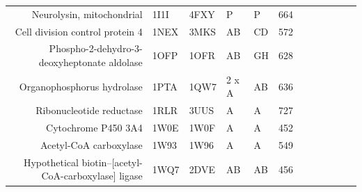 \begin{table}
\begin{changemargin}{15mm}
\begin{scriptsize}
\begin{tabular}{ r p{0.8cm} p{0.8cm} p{0.8cm} p{0.8cm} l l l l l l l }
Neurolysin, mitochondrial                                & 1I1I & 4FXY & P     & P     & 664 & \cellcolor[rgb]{ 1,  .494,  .475}    & \cellcolor[rgb]{ 1,  .494,  .475}    & \cellcolor[rgb]{ 1,  .494,  .475}    & \cellcolor[rgb]{ 1,  .494,  .475}    & \cellcolor[rgb]{ 1,  .494,  .475}    & \cellcolor[rgb]{ .573,  .816,  .314} \\
Cell division control protein 4                          & 1NEX & 3MKS & AB    & CD    & 572 & \cellcolor[rgb]{ .573,  .816,  .314} & \cellcolor[rgb]{ 1,  .494,  .475}    & \cellcolor[rgb]{ 1,  .494,  .475}    & \cellcolor[rgb]{ .573,  .816,  .314} & \cellcolor[rgb]{ 1,  .494,  .475}    & \cellcolor[rgb]{ .573,  .816,  .314} \\
Phospho-2-dehydro-3-deoxyheptonate aldolase              & 1OFP & 1OFR & AB    & GH    & 628 & \cellcolor[rgb]{ 1,  .494,  .475}    & \cellcolor[rgb]{ 1,  .494,  .475}    & \cellcolor[rgb]{ 1,  .494,  .475}    & \cellcolor[rgb]{ .573,  .816,  .314} & \cellcolor[rgb]{ 1,  .494,  .475}    & \cellcolor[rgb]{ .573,  .816,  .314} \\
Organophosphorus hydrolase                               & 1PTA & 1QW7 & 2 x A & AB    & 636 & \cellcolor[rgb]{ 1,  .494,  .475}    & \cellcolor[rgb]{ 1,  .494,  .475}    & \cellcolor[rgb]{ 1,  .494,  .475}    & \cellcolor[rgb]{ 1,  .494,  .475}    & \cellcolor[rgb]{ 1,  .494,  .475}    & \cellcolor[rgb]{ 1,  .494,  .475}    \\
Ribonucleotide reductase                                 & 1RLR & 3UUS & A     & A     & 727 & \cellcolor[rgb]{ .573,  .816,  .314} & \cellcolor[rgb]{ .573,  .816,  .314} & \cellcolor[rgb]{ 1,  .494,  .475}    & \cellcolor[rgb]{ 1,  .494,  .475}    & \cellcolor[rgb]{ .573,  .816,  .314} & \cellcolor[rgb]{ 1,  .494,  .475}    \\
Cytochrome P450 3A4                                      & 1W0E & 1W0F & A     & A     & 452 & \cellcolor[rgb]{ 1,  .494,  .475}    & \cellcolor[rgb]{ 1,  .494,  .475}    & \cellcolor[rgb]{ 1,  .494,  .475}    & \cellcolor[rgb]{ 1,  .494,  .475}    & \cellcolor[rgb]{ 1,  .494,  .475}    & \cellcolor[rgb]{ 1,  .494,  .475}    \\
Acetyl-CoA carboxylase                                   & 1W93 & 1W96 & A     & A     & 549 & \cellcolor[rgb]{ .573,  .816,  .314} & \cellcolor[rgb]{ 1,  .494,  .475}    & \cellcolor[rgb]{ .573,  .816,  .314} & \cellcolor[rgb]{ .573,  .816,  .314} & \cellcolor[rgb]{ 1,  .494,  .475}    & \cellcolor[rgb]{ .573,  .816,  .314} \\
Hypothetical biotin--[acetyl-CoA-carboxylase] ligase     & 1WQ7 & 2DVE & AB    & AB    & 456 & \cellcolor[rgb]{ .573,  .816,  .314} & \cellcolor[rgb]{ .573,  .816,  .314} & \cellcolor[rgb]{ .573,  .816,  .314} & \cellcolor[rgb]{ .573,  .816,  .314} & \cellcolor[rgb]{ .573,  .816,  .314} & \cellcolor[rgb]{ .573,  .816,  .314} \\

\end{tabular}
\end{scriptsize}
\end{changemargin}
\end{table}
